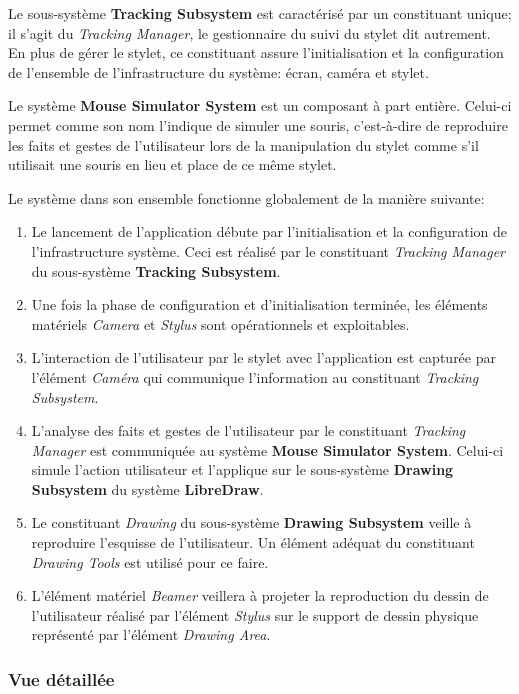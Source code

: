 \documentclass[11pt,a4paper,oldfontcommands]{memoir}
\begin{document}
Le sous-système \textbf{Tracking Subsystem} est caractérisé par un constituant unique; il s'agit du \textit{Tracking Manager}, le gestionnaire du suivi du stylet dit autrement. En plus de gérer le stylet, ce constituant assure l'initialisation et la configuration de l'ensemble de l'infrastructure du système: écran, caméra et stylet. 

Le système \textbf{Mouse Simulator System} est un composant à part entière. Celui-ci permet comme son nom l'indique de simuler une souris, c'est-à-dire de reproduire les faits et gestes de l'utilisateur lors de la manipulation du stylet comme s'il utilisait une souris en lieu et place de ce même stylet. 

Le système dans son ensemble fonctionne globalement de la manière suivante:

\begin{enumerate}
\item Le lancement de l'application débute par l'initialisation et la configuration de l'infrastructure système. Ceci est réalisé par le constituant \textit{Tracking Manager} du sous-système \textbf{Tracking Subsystem}.
\item Une fois la phase de configuration et d'initialisation terminée, les éléments matériels \textit{Camera} et \textit{Stylus} sont opérationnels et exploitables.
\item L'interaction de l'utilisateur par le stylet avec l'application est capturée par l'élément \textit{Caméra} qui communique l'information au constituant \textit{Tracking Subsystem}.
\item L'analyse des faits et gestes de l'utilisateur par le constituant \textit{Tracking Manager} est communiquée au système \textbf{Mouse Simulator System}. Celui-ci simule l'action utilisateur et l'applique sur le sous-système \textbf{Drawing Subsystem} du système \textbf{LibreDraw}.
\item Le constituant \textit{Drawing} du sous-système \textbf{Drawing Subsystem} veille à reproduire l'esquisse de l'utilisateur. Un élément adéquat du constituant \textit{Drawing Tools} est utilisé pour ce faire.
\item L'élément matériel \textit{Beamer} veillera à projeter la reproduction du dessin de l'utilisateur réalisé par l'élément \textit{Stylus} sur le support de dessin physique représenté par l'élément \textit{Drawing Area}.
\end{enumerate}

\newpage

\subsubsection{Vue détaillée}
\end{document}

